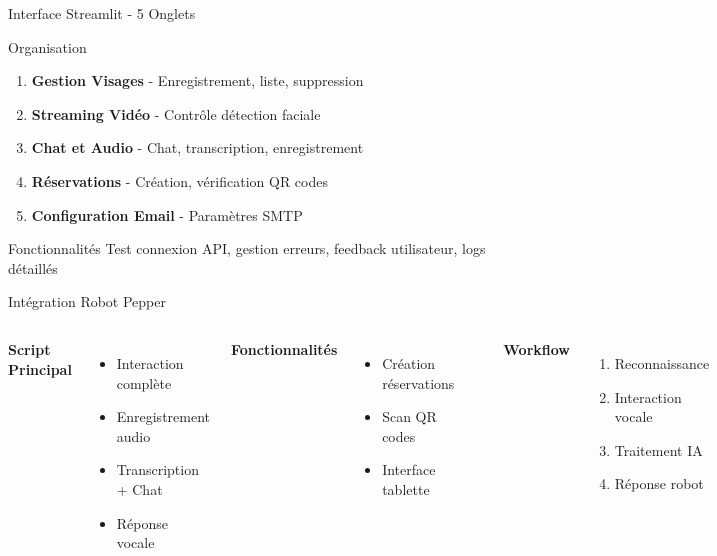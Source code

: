 \documentclass[aspectratio=169,11pt]{beamer}
\begin{document}
\begin{frame}{Interface Streamlit - 5 Onglets}
\begin{block}{Organisation}
\begin{enumerate}
    \item \textcolor{primaryblue}{\faUser} \textbf{Gestion Visages} - Enregistrement, liste, suppression
    \item \textcolor{primaryblue}{\faVideo} \textbf{Streaming Vidéo} - Contrôle détection faciale
    \item \textcolor{primaryblue}{\faComments} \textbf{Chat et Audio} - Chat, transcription, enregistrement
    \item \textcolor{primaryblue}{\faBed} \textbf{Réservations} - Création, vérification QR codes
    \item \textcolor{primaryblue}{\faEnvelope} \textbf{Configuration Email} - Paramètres SMTP
\end{enumerate}
\end{block}

\begin{block}{Fonctionnalités}
Test connexion API, gestion erreurs, feedback utilisateur, logs détaillés
\end{block}
\end{frame}

\begin{frame}{Intégration Robot Pepper}
\begin{columns}
\textbf{Script Principal}
\begin{itemize}
    \item Interaction complète
    \item Enregistrement audio
    \item Transcription + Chat
    \item Réponse vocale
\end{itemize}

\vspace{0.5cm}

\textbf{Fonctionnalités}
\begin{itemize}
    \item Création réservations
    \item Scan QR codes
    \item Interface tablette
\end{itemize}

\begin{center}
\Large
\textcolor{accentorange}{\faRobot\ \faCheckCircle}
\end{center}

\textbf{Workflow}
\begin{enumerate}
    \item Reconnaissance
    \item Interaction vocale
    \item Traitement IA
    \item Réponse robot
\end{enumerate}
\end{columns}
\end{frame}
\end{document}
